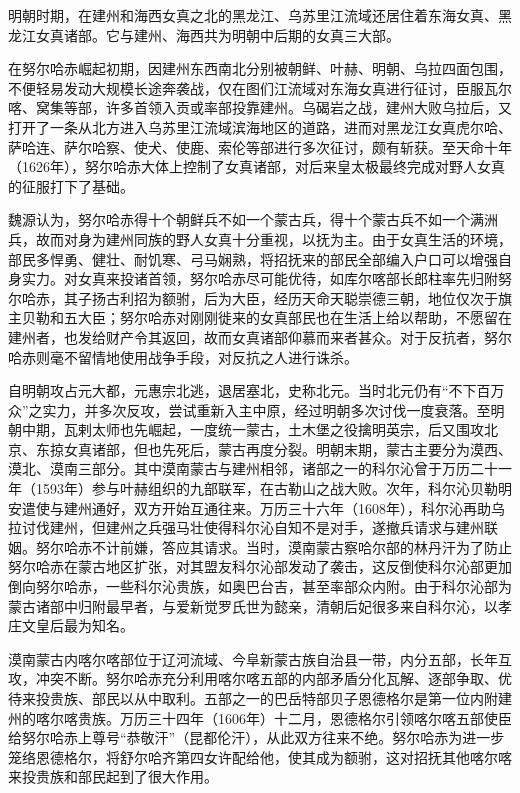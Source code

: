 明朝时期，在建州和海西女真之北的黑龙江、乌苏里江流域还居住着东海女真、黑龙江女真诸部。它与建州、海西共为明朝中后期的女真三大部。

在努尔哈赤崛起初期，因建州东西南北分别被朝鲜、叶赫、明朝、乌拉四面包围，不便轻易发动大规模长途奔袭战，仅在图们江流域对东海女真进行征讨，臣服瓦尔喀、窝集等部，许多首领入贡或率部投靠建州。乌碣岩之战，建州大败乌拉后，又打开了一条从北方进入乌苏里江流域滨海地区的道路，进而对黑龙江女真虎尔哈、萨哈连、萨尔哈察、使犬、使鹿、索伦等部进行多次征讨，颇有斩获。至天命十年（1626年），努尔哈赤大体上控制了女真诸部，对后来皇太极最终完成对野人女真的征服打下了基础。

魏源认为，努尔哈赤得十个朝鲜兵不如一个蒙古兵，得十个蒙古兵不如一个满洲兵，故而对身为建州同族的野人女真十分重视，以抚为主。由于女真生活的环境，部民多悍勇、健壮、耐饥寒、弓马娴熟，将招抚来的部民全部编入户口可以增强自身实力。对女真来投诸首领，努尔哈赤尽可能优待，如库尔喀部长郎柱率先归附努尔哈赤，其子扬古利招为额驸，后为大臣，经历天命天聪崇德三朝，地位仅次于旗主贝勒和五大臣；努尔哈赤对刚刚徙来的女真部民也在生活上给以帮助，不愿留在建州者，也发给财产令其返回，故而女真诸部仰慕而来者甚众。对于反抗者，努尔哈赤则毫不留情地使用战争手段，对反抗之人进行诛杀。

自明朝攻占元大都，元惠宗北逃，退居塞北，史称北元。当时北元仍有“不下百万众”之实力，并多次反攻，尝试重新入主中原，经过明朝多次讨伐一度衰落。至明朝中期，瓦剌太师也先崛起，一度统一蒙古，土木堡之役擒明英宗，后又围攻北京、东掠女真诸部，但也先死后，蒙古再度分裂。明朝末期，蒙古主要分为漠西、漠北、漠南三部分。其中漠南蒙古与建州相邻，诸部之一的科尔沁曾于万历二十一年（1593年）参与叶赫组织的九部联军，在古勒山之战大败。次年，科尔沁贝勒明安遣使与建州通好，双方开始互通往来。万历三十六年（1608年），科尔沁再助乌拉讨伐建州，但建州之兵强马壮使得科尔沁自知不是对手，遂撤兵请求与建州联姻。努尔哈赤不计前嫌，答应其请求。当时，漠南蒙古察哈尔部的林丹汗为了防止努尔哈赤在蒙古地区扩张，对其盟友科尔沁部发动了袭击，这反倒使科尔沁部更加倒向努尔哈赤，一些科尔沁贵族，如奥巴台吉，甚至率部众内附。由于科尔沁部为蒙古诸部中归附最早者，与爱新觉罗氏世为懿亲，清朝后妃很多来自科尔沁，以孝庄文皇后最为知名。

漠南蒙古内喀尔喀部位于辽河流域、今阜新蒙古族自治县一带，内分五部，长年互攻，冲突不断。努尔哈赤充分利用喀尔喀五部的内部矛盾分化瓦解、逐部争取、优待来投贵族、部民以从中取利。五部之一的巴岳特部贝子恩德格尔是第一位内附建州的喀尔喀贵族。万历三十四年（1606年）十二月，恩德格尔引领喀尔喀五部使臣给努尔哈赤上尊号“恭敬汗”（昆都伦汗），从此双方往来不绝。努尔哈赤为进一步笼络恩德格尔，将舒尔哈齐第四女许配给他，使其成为额驸，这对招抚其他喀尔喀来投贵族和部民起到了很大作用。

